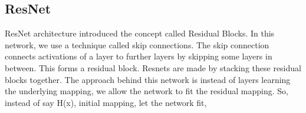         \vspace{0.5in}
        \begin{figure}[hbt!]
        \end{figure}

        \subsection*{ResNet}
        ResNet architecture introduced the concept called Residual Blocks. In this network, we use a technique called skip connections. The skip connection connects activations of a  layer to further layers by skipping some layers in between. This forms a residual block. Resnets are made by stacking these residual blocks together. 
        The approach behind this network is instead of layers learning the underlying mapping, we allow the network to fit the residual mapping. So, instead of say H(x), initial mapping, let the network fit,

        \begin{figure}[hbt!]
        \end{figure}


